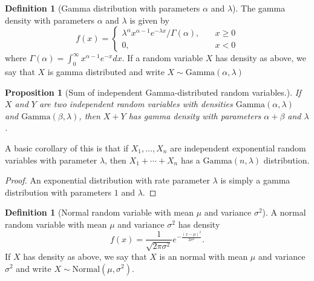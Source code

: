 \documentclass[12pt]{article}
\newtheorem{prop}[thm]{Proposition}
\theoremstyle{definition}
\newtheorem{defn}[thm]{Definition}
\theoremstyle{remark}
\numberwithin{equation}{section}
\begin{document}

\begin{defn}[Gamma distribution with parameters $\alpha$ and $\lambda$]
  The gamma density with parameters $\alpha$ and $\lambda$ is given by
  \begin{equation}
    f(x) = \begin{cases}
      \lambda^\alpha x^{\alpha-1}e^{-\lambda x} / \Gamma(\alpha), \quad& x\geq0\\
      0, \quad& x<0
    \end{cases}
  \end{equation}
where $\Gamma(\alpha) = \int_0^\infty x^{\alpha - 1}e^{-x}dx.$ If a random variable $X$ has density as above, we say that $X$ is gamma distributed and write $X\sim\text{Gamma}(\alpha, \lambda)$
\end{defn}


\begin{prop}[Sum of independent Gamma-distributed random variables.]
  If $X$ and $Y$ are two independent random variables with densities $\text{Gamma}(\alpha, \lambda)$ and $\text{Gamma}(\beta, \lambda)$, then $X+Y$ has gamma density with parameters $\alpha + \beta$ and $\lambda$.
\end{prop}

A basic corollary of this is that if $X_1, \ldots, X_n$ are independent exponential random variables with parameter $\lambda$, then $X_1 + \cdots + X_n$ has a $\text{Gamma}(n, \lambda)$ distribution. 

\begin{proof}
  An exponential distribution with rate parameter $\lambda$ is simply a gamma distribution with parameters $1$ and $\lambda$.
\end{proof}

\begin{defn}[Normal random variable with mean $\mu$ and variance $\sigma^2$]
  A normal random variable with mean $\mu$ and variance $\sigma^2$ has density
  \begin{equation}
    f(x) = \frac{1}{\sqrt{2\pi \sigma^2}} e^{-\frac{(x-\mu)^2}{2\sigma^2}}.
  \end{equation}
  If $X$ has density as above, we say that $X$ is an normal with mean $\mu$ and variance $\sigma^2$ and write $X\sim \text{Normal}(\mu, \sigma^2)$.
\end{defn}
\end{document}
